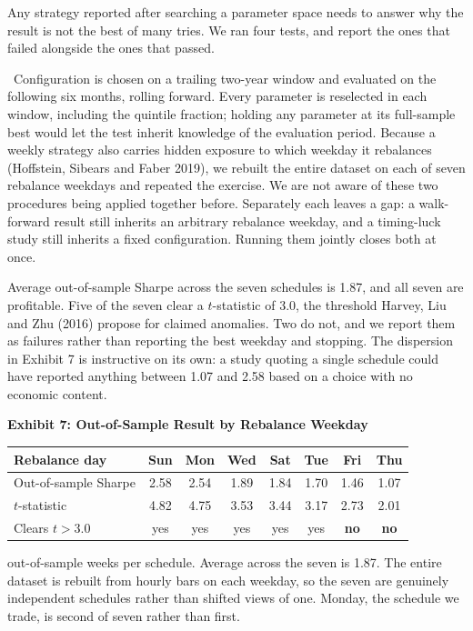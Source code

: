 \documentclass[12pt]{article}
\makeatletter
\renewcommand{\section}[1]{\par\vspace{16pt}%
  \noindent{\bfseries\MakeUppercase{#1}}\par\nobreak\vspace{4pt}%
  \@afterindenttrue\@afterheading}
\newcommand{\runin}[1]{\par\vspace{2pt}\noindent\hspace*{0.5in}{\bfseries #1}\ \ignorespaces}
\newenvironment{exhibit}[2]{%
  \par\vspace{14pt}\noindent\begin{minipage}{\textwidth}\centering\small
  \textbf{Exhibit #1: #2}\par\vspace{6pt}}%
  {\end{minipage}\par\vspace{12pt}}
\newcommand{\exnote}[1]{\par\vspace{4pt}%
  \begin{minipage}{0.88\textwidth}\fontsize{9}{11}\selectfont #1\end{minipage}}
\makeatother
\begin{document}
\section{Is It Real?}

Any strategy reported after searching a parameter space needs to answer why the
result is not the best of many tries. We ran four tests, and report the ones that
failed alongside the ones that passed.

\runin{Selection out of sample.}Configuration is chosen on a trailing two-year window and evaluated on the
following six months, rolling forward. Every parameter is reselected in each
window, including the quintile fraction; holding any parameter at its
full-sample best would let the test inherit knowledge of the evaluation period.
Because a weekly strategy also carries hidden exposure to which weekday it
rebalances (Hoffstein, Sibears and Faber 2019), we rebuilt the entire dataset on
each of seven rebalance weekdays and repeated the exercise. We are not aware of
these two procedures being applied together before. Separately each leaves a gap:
a walk-forward result still inherits an arbitrary rebalance weekday, and a
timing-luck study still inherits a fixed configuration. Running them jointly
closes both at once.

Average out-of-sample Sharpe across the seven schedules is 1.87, and all seven are
profitable. Five of the seven clear a $t$-statistic of 3.0, the threshold Harvey,
Liu and Zhu (2016) propose for claimed anomalies. Two do not, and we report them
as failures rather than reporting the best weekday and stopping. The dispersion in
Exhibit 7 is instructive on its own: a study quoting a single schedule could have
reported anything between 1.07 and 2.58 based on a choice with no economic
content.

\begin{exhibit}{7}{Out-of-Sample Result by Rebalance Weekday}
\begin{tabular}{lccccccc}
\toprule
Rebalance day & Sun & Mon & Wed & Sat & Tue & Fri & Thu \\
\midrule
Out-of-sample Sharpe & 2.58 & 2.54 & 1.89 & 1.84 & 1.70 & 1.46 & 1.07 \\
$t$-statistic & 4.82 & 4.75 & 3.53 & 3.44 & 3.17 & 2.73 & 2.01 \\
Clears $t>3.0$ & yes & yes & yes & yes & yes & \textbf{no} & \textbf{no} \\
\bottomrule
\end{tabular}
\exnote{182 out-of-sample weeks per schedule. Average across the seven is 1.87.
The entire dataset is rebuilt from hourly bars on each weekday, so the seven are
genuinely independent schedules rather than shifted views of one. Monday, the
schedule we trade, is second of seven rather than first.}
\end{exhibit}
\end{document}
